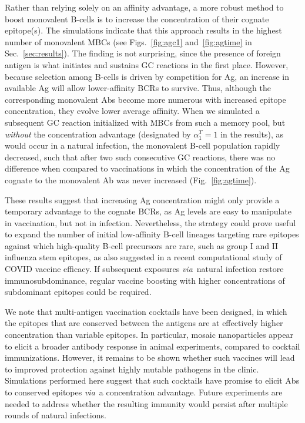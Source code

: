 \documentclass[utf8]{frontiersHLTH}%
\newcommand{\cred}[1]{\textsf{\color{red}#1}}
\def\via {{\it via}}
\newcommand{\fig}[1]{Fig.~\ref{fig:#1}}
\newcommand{\figs}[2]{Figs.~\ref{fig:#1} and~\ref{fig:#2}}
\newcommand{\Sec}[1]{Sec.~\ref{sec:#1}}
\renewcommand{\sec}[1]{\Sec{#1}}
\begin{document}
Rather than relying solely on an affinity advantage, a more robust method
to boost monovalent B-cells is to increase the concentration of their cognate
epitope(s). The simulations indicate that this approach results in the highest
number of monovalent MBCs (see \figs{agc1}{agtime} in \sec{results}).
The finding is not surprising, since the presence of foreign
antigen is what initiates and sustains GC reactions in the first place.
However, because selection among B-cells is driven by competition for Ag, an
increase in available Ag will allow lower-affinity BCRs to survive.
Thus, although the corresponding monovalent Abs become more numerous with increased epitope concentration,
they evolve lower average affinity.
When we simulated a subsequent
GC reaction initialized with MBCs from such a memory pool, but
\textit{without} the concentration advantage (designated by $\alpha_1^T=1$ in
the results), as would occur in a
natural infection, the monovalent B-cell population rapidly decreased,
such that after two such consecutive GC reactions, there was no difference
when compared to vaccinations in which the concentration of the Ag
cognate to the monovalent Ab was never increased (\fig{agtime}).

These results suggest
that increasing Ag concentration might only provide a temporary advantage
to the cognate BCRs, as Ag levels are easy to manipulate in
vaccination, but not in infection. \cred{Nevertheless, the strategy could prove
useful to expand the number of initial low-affinity B-cell lineages
targeting rare epitopes against which high-quality B-cell precursors are
rare, such as group I and II influenza stem epitopes, as also suggested 
in a recent computational study of COVID vaccine efficacy.\cite{garg21}}
%
If subsequent
exposures \via~natural infection restore immunosubdominance,\cite{ellebedy14} regular
vaccine boosting with higher concentrations of subdominant epitopes could be
required.


\cred{We note that multi-antigen vaccination cocktails have been designed, in
which the epitopes that are conserved between the antigens are at
effectively higher concentration than variable
epitopes.\cite{kanekiyo19,cohen21,glanville20} In particular, mosaic
nanoparticles appear to elicit a broader antibody response in animal
experiments, compared to cocktail immunizations.\cite{kanekiyo19,cohen21}
However, it remains to be shown whether such vaccines will lead to
improved protection against highly mutable pathogens in the clinic.}
%
Simulations performed here suggest that such cocktails have promise to
elicit Abs to conserved epitopes \via~a concentration advantage.  Future
experiments are needed to address whether the resulting immunity would
persist after multiple rounds of natural infections.
\end{document}
